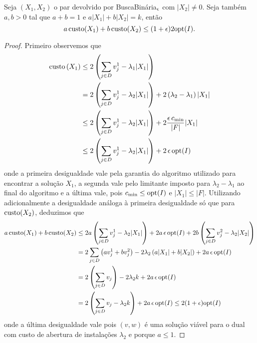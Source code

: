 \begin{lemma}
    \label{k-median_relLag_lema1}
    Seja $(X_1,X_2)$ o par devolvido por {\sc BuscaBinária}$_\epsilon$ com $|X_2| \neq 0$. Seja também $a,b > 0$ tal que $a + b = 1 $ e $a|X_1| + b|X_2| = k$, então
    \[a \, \mathrm{custo}(X_1) + b \,\mathrm{custo}(X_2) \leq (1+\epsilon) 2\mathrm{opt}(I).\]
\end{lemma}
\begin{proof}
Primeiro observemos que 
\begin{subequations}
    \begin{align*}
        \mathrm{custo}\left(X_1\right) &\leq 2\left(\sum_{j \in D} v_j^1 - \lambda_1|X_1|\right) \\
        & = 2 \left(\sum_{j \in D} v_j^1 - \lambda_2 |X_1| \right) + 2 \left(\lambda_2 - \lambda_1\right) |X_1| \\
        &\leq 2 \left(\sum_{j \in D} v_j^1 - \lambda_2 |X_1| \right) + 2\frac{\epsilon\, c_{\min}}{|F|}|X_1|  \\
        &\leq 2 \left(\sum_{j \in D} v_j^1 - \lambda_2 |X_1| \right) + 2 \, \epsilon \, \mathrm{opt}(I)
    \end{align*}
\end{subequations}
onde a primeira desigualdade vale pela garantia do algoritmo utilizado para encontrar a solução $X_1$, a segunda vale pelo limitante imposto para $\lambda_2 - \lambda_1$ ao final do algoritmo e a última vale, pois $c_{\min} \leq \mathrm{opt}(I)$ e $|X_1| \leq |F|$. Utilizando adicionalmente a desigualdade análoga à primeira desigualdade só que para $\mathrm{custo}(X_2)$, deduzimos que
\begin{subequations}
    \begin{align*}
        a \, \mathrm{custo}(X_1) + b \,\mathrm{custo}(X_2) &\leq 2a \left(\sum_{j\in D} v_j^1 - \lambda_2|X_1|\right) + 2a\, \epsilon\,\mathrm{opt}(I) + 2b\left(\sum_{j\in D} v_j^2 - \lambda_2|X_2|\right) \\
        &= 2\sum_{j \in D} \left(a v_j^1 + b v_j^2\right) - 2\lambda_2\left( a|X_1| + b|X_2|\right) + 2a\,\epsilon\,\mathrm{opt}(I)\\
        & = 2\left(\sum_{j\in D } v_j\right) - 2\lambda_2 k + 2a\,\epsilon\,\mathrm{opt}(I)\\
        & = 2\left( \sum_{j \in D } v_j -\lambda_2 k\right) + 2a\,\epsilon\,\mathrm{opt}(I) \leq 2(1+\epsilon)\mathrm{opt}(I)
    \end{align*}
\end{subequations}
onde a última desigualdade vale pois $(v,w)$ é uma solução viável para o dual com custo de abertura de instalações $\lambda_2$ e porque $a \leq 1$.
\end{proof}

